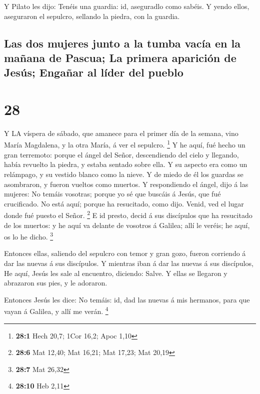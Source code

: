  Y Pilato les dijo: Tenéis una guardia: id, aseguradlo como
sabéis.  Y yendo ellos, aseguraron el sepulcro, sellando la
piedra, con la guardia.

\hypertarget{las-dos-mujeres-junto-a-la-tumba-vacuxeda-en-la-mauxf1ana-de-pascua-la-primera-apariciuxf3n-de-jesuxfas-engauxf1ar-al-luxedder-del-pueblo}{%
\subsection{Las dos mujeres junto a la tumba vacía en la mañana de
Pascua; La primera aparición de Jesús; Engañar al líder del
pueblo}\label{las-dos-mujeres-junto-a-la-tumba-vacuxeda-en-la-mauxf1ana-de-pascua-la-primera-apariciuxf3n-de-jesuxfas-engauxf1ar-al-luxedder-del-pueblo}}

\hypertarget{section-27}{%
\section{28}\label{section-27}}

 Y LA víspera de sábado, que amanece para el primer día de
la semana, vino María Magdalena, y la otra María, á ver el sepulcro.
\footnote{\textbf{28:1} Hech 20,7; 1Cor 16,2; Apoc 1,10}  Y
he aquí, fué hecho un gran terremoto: porque el ángel del Señor,
descendiendo del cielo y llegando, había revuelto la piedra, y estaba
sentado sobre ella.  Y su aspecto era como un relámpago, y
su vestido blanco como la nieve.  Y de miedo de él los
guardas se asombraron, y fueron vueltos como muertos.  Y
respondiendo el ángel, dijo á las mujeres: No temáis vosotras; porque yo
sé que buscáis á Jesús, que fué crucificado.  No está aquí;
porque ha resucitado, como dijo. Venid, ved el lugar donde fué puesto el
Señor. \footnote{\textbf{28:6} Mat 12,40; Mat 16,21; Mat 17,23; Mat
  20,19}  E id presto, decid á sus discípulos que ha
resucitado de los muertos: y he aquí va delante de vosotros á Galilea;
allí le veréis; he aquí, os lo he dicho. \footnote{\textbf{28:7} Mat
  26,32}

 Entonces ellas, saliendo del sepulcro con temor y gran
gozo, fueron corriendo á dar las nuevas á sus discípulos. Y mientras
iban á dar las nuevas á sus discípulos,  He aquí, Jesús les
sale al encuentro, diciendo: Salve. Y ellas se llegaron y abrazaron sus
pies, y le adoraron.

 Entonces Jesús les dice: No temáis: id, dad las nuevas á
mis hermanos, para que vayan á Galilea, y allí me verán. \footnote{\textbf{28:10}
  Heb 2,11}

